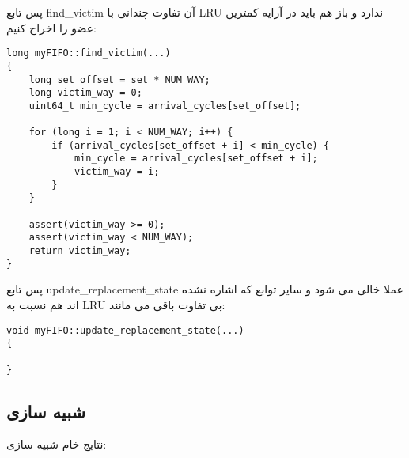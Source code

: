 \documentclass[17pt]{article}
\begin{document}
پس تابع find\_victim آن تفاوت چندانی با LRU ندارد و باز هم باید در آرایه کمترین عضو را اخراج کنیم:

\begin{LTR}
\begin{lstlisting}
long myFIFO::find_victim(...)
{
    long set_offset = set * NUM_WAY;
    long victim_way = 0;
    uint64_t min_cycle = arrival_cycles[set_offset];

    for (long i = 1; i < NUM_WAY; i++) {
        if (arrival_cycles[set_offset + i] < min_cycle) {
            min_cycle = arrival_cycles[set_offset + i];
            victim_way = i;
        }
    }

    assert(victim_way >= 0);
    assert(victim_way < NUM_WAY);
    return victim_way;
}
\end{lstlisting}
\end{LTR}

پس تابع update\_replacement\_state عملا خالی می شود و سایر توابع که اشاره نشده اند هم نسبت به LRU بی تفاوت باقی می مانند:
\begin{LTR}
\begin{lstlisting}
void myFIFO::update_replacement_state(...)
{

}
\end{lstlisting}
\end{LTR}

\subsection{شبیه سازی}
نتایج خام شبیه سازی:
\end{document}
